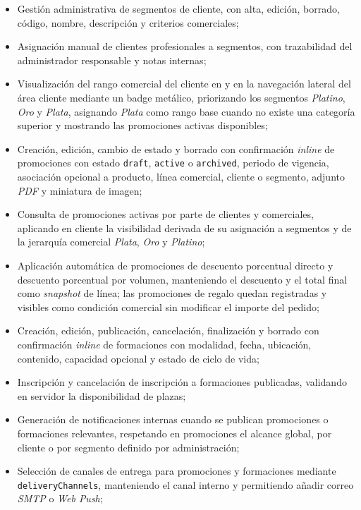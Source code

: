 \begin{itemize}
    \item Gestión administrativa de segmentos de cliente, con alta, edición, borrado, código, nombre, descripción y criterios comerciales;
    \item Asignación manual de clientes profesionales a segmentos, con trazabilidad del administrador responsable y notas internas;
    \item Visualización del rango comercial del cliente en  y en la navegación lateral del área cliente mediante un badge metálico, priorizando los segmentos \textit{Platino}, \textit{Oro} y \textit{Plata}, asignando \textit{Plata} como rango base cuando no existe una categoría superior y mostrando las promociones activas disponibles;
    \item Creación, edición, cambio de estado y borrado con confirmación \textit{inline} de promociones con estado \texttt{draft}, \texttt{active} o \texttt{archived}, periodo de vigencia, asociación opcional a producto, línea comercial, cliente o segmento, adjunto \textit{PDF} y miniatura de imagen;
    \item Consulta de promociones activas por parte de clientes y comerciales, aplicando en cliente la visibilidad derivada de su asignación a segmentos y de la jerarquía comercial \textit{Plata}, \textit{Oro} y \textit{Platino};
    \item Aplicación automática de promociones de descuento porcentual directo y descuento porcentual por volumen, manteniendo el descuento y el total final como \textit{snapshot} de línea; las promociones de regalo quedan registradas y visibles como condición comercial sin modificar el importe del pedido;
    \item Creación, edición, publicación, cancelación, finalización y borrado con confirmación \textit{inline} de formaciones con modalidad, fecha, ubicación, contenido, capacidad opcional y estado de ciclo de vida;
    \item Inscripción y cancelación de inscripción a formaciones publicadas, validando en servidor la disponibilidad de plazas;
    \item Generación de notificaciones internas cuando se publican promociones o formaciones relevantes, respetando en promociones el alcance global, por cliente o por segmento definido por administración;
    \item Selección de canales de entrega para promociones y formaciones mediante \texttt{deliveryChannels}, manteniendo el canal interno y permitiendo añadir correo \textit{SMTP} o \textit{Web Push};

\end{itemize}

